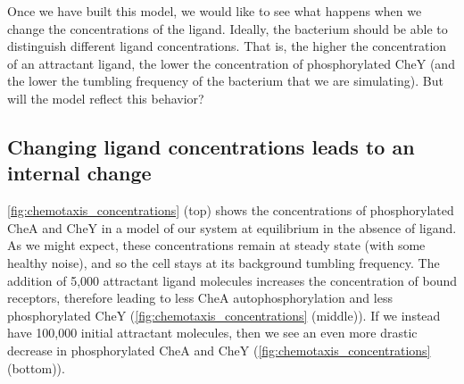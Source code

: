 Once we have built this model, we would like to see what happens when we change the concentrations of the ligand. Ideally, the bacterium should be able to distinguish different ligand concentrations. That is, the higher the concentration of an attractant ligand, the lower the concentration of phosphorylated CheY (and the lower the tumbling frequency of the bacterium that we are simulating). But will the model reflect this behavior?

\FloatBarrier
{}
\subsection{Changing ligand concentrations leads to an internal change}

\autoref{fig:chemotaxis_concentrations} (top) shows the concentrations of phosphorylated CheA and CheY in a model of our system at equilibrium in the absence of ligand. As we might expect, these concentrations remain at steady state (with some healthy noise), and so the cell stays at its background tumbling frequency. The addition of 5,000 attractant ligand molecules increases the concentration of bound receptors, therefore leading to less CheA autophosphorylation and less phosphorylated CheY (\autoref{fig:chemotaxis_concentrations} (middle)). If we instead have 100,000 initial attractant molecules, then we see an even more drastic decrease in phosphorylated CheA and CheY (\autoref{fig:chemotaxis_concentrations} (bottom)).

